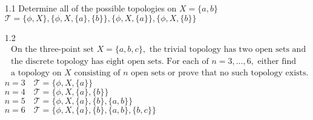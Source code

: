 \documentclass[12pt]{article}
\begin{document}
\begin{enumerate}
	\item[1.1] Determine all of the possible topologies on  $ X =\{a,b\}$\\
			$ \mathcal{ T } = \{\phi, X\},\{\phi,X,\{a\},\{b\}\},\{\phi,X,\{a\}\},\{\phi,X,\{b\}\}   $
	\item[1.2]$  \begin{array} { l } { \text { On the three-point set } X = \{ a , b , c \} , \text { the trivial topology has two open sets and } } \\ { \text { the discrete topology has eight open sets. For each of } n = 3 , \ldots , 6 , \text { either find } } \\ { \text { a topology on } X \text { consisting of } n \text { open sets or prove that no such topology exists. } } \end{array} $\\
	$n=3 \quad \mathcal{ T }= \{\phi,X,\{a\}\} $\\
	$n=4 \quad \mathcal{ T }= \{\phi,X,\{a\},\{b\}\} $\\
	$n=5 \quad \mathcal{ T }= \{\phi,X,\{a\},\{b\},\{a,b\}\} $\\
	$n=6 \quad \mathcal{ T }= \{\phi,X,\{a\},\{b\},\{a,b\},\{b,c\}\} $\\
	

\end{enumerate}
\end{document}

